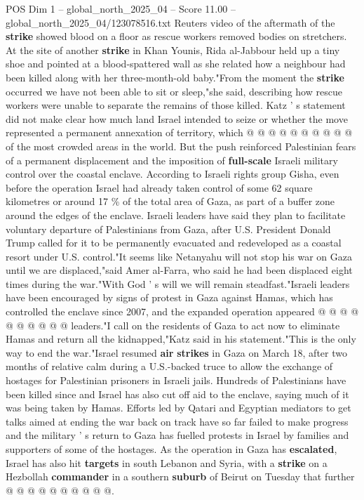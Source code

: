 \begin{textsample}{POS Dim 1 – global\_north\_2025\_04 – Score 11.00 – global\_north\_2025\_04/123078516.txt}
Reuters video of the aftermath of the \textbf{strike} showed blood on a floor as rescue workers removed bodies on stretchers.
At the site of another \textbf{strike} in Khan Younis, Rida al-Jabbour held up a tiny shoe and pointed at a blood-spattered wall as she related how a neighbour had been killed along with her three-month-old baby."From the moment the \textbf{strike} occurred we have not been able to sit or sleep,"she said, describing how rescue workers were unable to separate the remains of those killed.
Katz ' s statement did not make clear how much land Israel intended to seize or whether the move represented a permanent annexation of territory, which @ @ @ @ @ @ @ @ @ @ of the most crowded areas in the world.
But the push reinforced Palestinian fears of a permanent displacement and the imposition of \textbf{full-scale} Israeli military control over the coastal enclave.
According to Israeli rights group Gisha, even before the operation Israel had already taken control of some 62 square kilometres or around 17 \% of the total area of Gaza, as part of a buffer zone around the edges of the enclave.
Israeli leaders have said they plan to facilitate voluntary departure of Palestinians from Gaza, after U.S.
President Donald Trump called for it to be permanently evacuated and redeveloped as a coastal resort under U.S. control."It seems like Netanyahu will not stop his war on Gaza until we are displaced,"said Amer al-Farra, who said he had been displaced eight times during the war."With God ' s will we will remain steadfast."Israeli leaders have been encouraged by signs of protest in Gaza against Hamas, which has controlled the enclave since 2007, and the expanded operation appeared @ @ @ @ @ @ @ @ @ @ leaders."I call on the residents of Gaza to act now to eliminate Hamas and return all the kidnapped,"Katz said in his statement."This is the only way to end the war."Israel resumed \textbf{air} \textbf{strikes} in Gaza on March 18, after two months of relative calm during a U.S.-backed truce to allow the exchange of hostages for Palestinian prisoners in Israeli jails.
Hundreds of Palestinians have been killed since and Israel has also cut off aid to the enclave, saying much of it was being taken by Hamas.
Efforts led by Qatari and Egyptian mediators to get talks aimed at ending the war back on track have so far failed to make progress and the military ' s return to Gaza has fuelled protests in Israel by families and supporters of some of the hostages.
As the operation in Gaza has \textbf{escalated}, Israel has also hit \textbf{targets} in south Lebanon and Syria, with a \textbf{strike} on a Hezbollah \textbf{commander} in a southern \textbf{suburb} of Beirut on Tuesday that further @ @ @ @ @ @ @ @ @ @.

\end{textsample}
